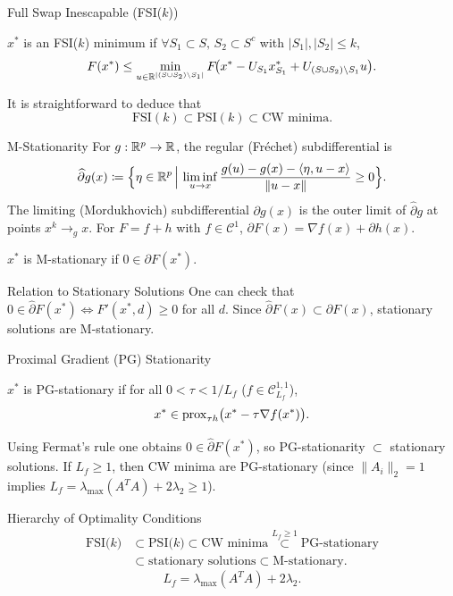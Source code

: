 \begin{frame}{Full Swap Inescapable (FSI($k$))}
\begin{definition}
$x^*$ is an \alert{FSI($k$) minimum} if $\forall S_1 \subset S,\, S_2 \subset S^c$ with $|S_1|,|S_2| \le k$,
\[
F(x^*) \le \min_{u \in \mathbb{R}^{|(S\cup S_2)\setminus S_1|}} F\!\bigl(x^* - U_{S_1}x^*_{S_1} + U_{(S\cup S_2)\setminus S_1} u\bigr).
\]
\end{definition}
It is straightforward to deduce that
\[
\text{FSI}(k) \subset \text{PSI}(k) \subset \text{CW minima}.
\]
\end{frame}

\begin{frame}{M-Stationarity}
For $g:\mathbb{R}^p\to\mathbb{R}$, the regular (Fréchet) subdifferential is
\[
\widehat{\partial} g(x) \coloneqq \Bigl\{ \eta \in \mathbb{R}^p \,\Big|\,
\liminf_{u \to x} \frac{g(u)-g(x)-\langle\eta,u-x\rangle}{\|u-x\|} \ge 0 \Bigr\}.
\]
The limiting (Mordukhovich) subdifferential $\partial g(x)$ is the outer limit of $\widehat{\partial} g$ at points $x^k \to_g x$.
For $F = f + h$ with $f \in \mathcal{C}^1$, $\partial F(x) = \nabla f(x) + \partial h(x)$.
\newline
\begin{definition}
$x^*$ is \alert{M-stationary} if $0 \in \partial F(x^*)$.
\end{definition}
\end{frame}

\begin{frame}{Relation to Stationary Solutions}
One can check that $0 \in \widehat{\partial} F(x^*)\Leftrightarrow F'(x^*,d) \ge 0$ for all $d$. 
Since $\widehat{\partial} F(x) \subset \partial F(x)$, stationary solutions are M-stationary.
\end{frame}

\begin{frame}{Proximal Gradient (PG) Stationarity}
\begin{definition}
$x^*$ is \alert{PG-stationary} if for all $0 < \tau < 1/L_f$ ($f\in\mathcal{C}^{1,1}_{L_f}$),
\[
x^* \in \operatorname{prox}_{\tau h}\bigl(x^* - \tau \nabla f(x^*)\bigr).
\]
\end{definition}
Using Fermat's rule one obtains $0 \in \widehat{\partial} F(x^*)$, so PG-stationarity $\subset$ stationary solutions.
If $L_f \ge 1$, then CW minima are PG-stationary (since $\|A_i\|_2=1$ implies $L_f = \lambda_{\max}(A^T A) + 2\lambda_2 \ge 1$).
\end{frame}

\begin{frame}{Hierarchy of Optimality Conditions}
\[
\begin{aligned}
\text{FSI($k$)} &\subset \text{PSI($k$)} \subset \text{CW minima} \overset{L_f\ge 1}{\subset} \text{PG-stationary}\\
&\subset \text{stationary solutions} \subset \text{M-stationary}.
\end{aligned}
\]
\[
L_f = \lambda_{\max}(A^T A) + 2\lambda_2.
\]
\end{frame}